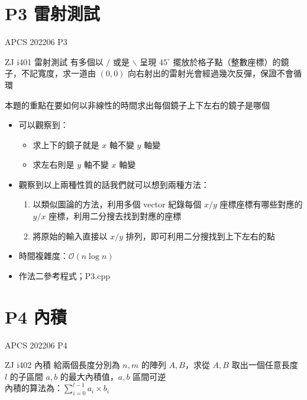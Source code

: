 \documentclass[aspectratio=169]{beamer}
\begin{document}
	\section{P3 雷射測試}    
    
    \begin{frame}{APCS 202206 P3}
    		\begin{block}{ZJ i401 雷射測試}
    			有多個以 $/$ 或是 $\backslash$ 呈現 $45^\circ$ 擺放於格子點（整數座標）的鏡子，不記寬度，求一道由 $(0,0)$ 向右射出的雷射光會經過幾次反彈，保證不會循環
    		\end{block}
    		
    \end{frame}
    
    \begin{frame}
    		本題的重點在要如何以非線性的時間求出每個鏡子上下左右的鏡子是哪個
    		\begin{itemize}
    		\item 可以觀察到：
    		\begin{itemize}
    			\item 求上下的鏡子就是 $x$ 軸不變 $y$ 軸變
			\item 求左右則是 $y$ 軸不變 $x$ 軸變
    		\end{itemize}
    		
    		\item 觀察到以上兩種性質的話我們就可以想到兩種方法：
    		\begin{enumerate}
    			\item 以類似圖論的方法，利用多個 vector 紀錄每個 $x/y$ 座標座標有哪些對應的 $y/x$ 座標，利用二分搜去找到對應的座標
			\item 將原始的輸入直接以 $x/y$ 排列，即可利用二分搜找到上下左右的點
    		\end{enumerate}
    		
    		\item 時間複雜度：$\mathcal{O}(n\log n)$
    		\item 作法二參考程式；P3.cpp
    		\end{itemize}
    \end{frame}
    
    \section{P4 內積}
    
    \begin{frame}{APCS 202206 P4}
    		\begin{block}{ZJ i402 內積}
    			給兩個長度分別為 $n, m$ 的陣列 $A, B$，求從 $A, B$ 取出一個任意長度 $l$ 的子區間 $a, b$ 的最大內積值，$a, b$ 區間可逆\\
			內積的算法為：$\displaystyle\sum_{i=0}^{l-1}{a_i \times b_i}$
    		\end{block}
    		
    \end{frame}
    
\end{document}
